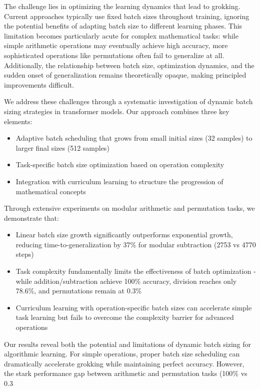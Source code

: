 \documentclass{article} %
\begin{document}
The challenge lies in optimizing the learning dynamics that lead to grokking. Current approaches typically use fixed batch sizes throughout training, ignoring the potential benefits of adapting batch size to different learning phases. This limitation becomes particularly acute for complex mathematical tasks: while simple arithmetic operations may eventually achieve high accuracy, more sophisticated operations like permutations often fail to generalize at all. Additionally, the relationship between batch size, optimization dynamics, and the sudden onset of generalization remains theoretically opaque, making principled improvements difficult.

We address these challenges through a systematic investigation of dynamic batch sizing strategies in transformer models. Our approach combines three key elements:
\begin{itemize}
    \item Adaptive batch scheduling that grows from small initial sizes (32 samples) to larger final sizes (512 samples)
    \item Task-specific batch size optimization based on operation complexity
    \item Integration with curriculum learning to structure the progression of mathematical concepts
\end{itemize}

Through extensive experiments on modular arithmetic and permutation tasks, we demonstrate that:
\begin{itemize}
    \item Linear batch size growth significantly outperforms exponential growth, reducing time-to-generalization by 37\% for modular subtraction (2753 vs 4770 steps)
    \item Task complexity fundamentally limits the effectiveness of batch optimization - while addition/subtraction achieve 100\% accuracy, division reaches only 78.6\%, and permutations remain at 0.3\%
    \item Curriculum learning with operation-specific batch sizes can accelerate simple task learning but fails to overcome the complexity barrier for advanced operations
\end{itemize}

Our results reveal both the potential and limitations of dynamic batch sizing for algorithmic learning. For simple operations, proper batch size scheduling can dramatically accelerate grokking while maintaining perfect accuracy. However, the stark performance gap between arithmetic and permutation tasks (100\% vs 0.3%
\end{document}
